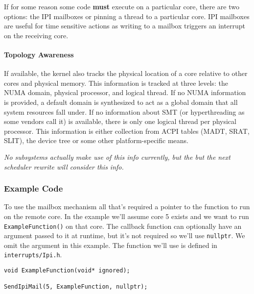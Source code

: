 If for some reason some code \textbf{must} execute on a particular core, there are two options: the IPI mailboxes or pinning a thread to a particular core. IPI mailboxes are useful for time sensitive actions as writing to a mailbox triggers an interrupt on the receiving core.

\paragraph{Topology Awareness}
If available, the kernel also tracks the physical location of a core relative to other cores and physical memory. This information is tracked at three levels: the NUMA domain, physical processor, and logical thread. If no NUMA information is provided, a default domain is synthesized to act as a global domain that all system resources fall under. If no information about SMT (or hyperthreading as some vendors call it) is available, there is only one logical thread per physical processor. This information is either collection from ACPI tables (MADT, SRAT, SLIT), the device tree or some other platform-specific means.

\textit{No subsystems actually make use of this info currently, but the but the next scheduler rewrite will consider this info.}

\subsubsection{Example Code}
To use the mailbox mechanism all that's required a pointer to the function to run on the remote core. In the example we'll assume core 5 exists and we want to run \verb|ExampleFunction()| on that core. The callback function can optionally have an argument passed to it at runtime, but it's not required so we'll use \verb|nullptr|. We omit the argument in this example. The function we'll use is defined in \verb|interrupts/Ipi.h|.

\begin{lstlisting}
void ExampleFunction(void* ignored);

SendIpiMail(5, ExampleFunction, nullptr);
\end{lstlisting}
